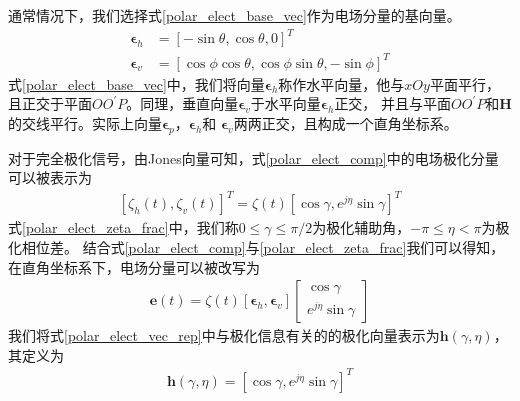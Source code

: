 \documentclass[master]{thesis-uestc}
\begin{document}
通常情况下，我们选择式\eqref{polar_elect_base_vec}作为电场分量的基向量。
\begin{subequations}\label{polar_elect_base_vec}
    \begin{align}
        \bm{\epsilon}_{h} &=[-\sin \theta, \cos \theta, 0]^{T} \\
        \bm{\epsilon}_{v} &=[\cos \phi \cos \theta, \cos \phi \sin \theta,-\sin \phi]^{T}
    \end{align}
\end{subequations}
式\eqref{polar_elect_base_vec}中，我们将向量$\bm{\epsilon}_h$称作水平向量，他与$xOy$平面平行，
且正交于平面$OO^\prime P$。同理，垂直向量$\bm{\epsilon}_v$于水平向量$\bm{\epsilon}_h$正交，
并且与平面$OO^\prime P$和$\bm{H}$的交线平行。实际上向量$\bm{\epsilon}_p$，$\bm{\epsilon}_h$和
$\bm{\epsilon}_v$两两正交，且构成一个直角坐标系。

对于完全极化信号，由Jones向量可知，式\eqref{polar_elect_comp}中的电场极化分量可以被表示为
\begin{equation}\label{polar_elect_zeta_frac}
    \begin{aligned}
        \left[\zeta_{h}(t), \zeta_{v}(t)\right]^{T}=\zeta(t)\left[\cos \gamma, e^{j \eta} \sin \gamma\right]^{T}
    \end{aligned}
\end{equation}
式\eqref{polar_elect_zeta_frac}中，我们称$0\le\gamma\le\pi/2$为极化辅助角，$-\pi\le\eta<\pi$为极化相位差。
结合式\eqref{polar_elect_comp}与\eqref{polar_elect_zeta_frac}我们可以得知，在直角坐标系下，电场分量可以被改写为
\begin{equation}\label{polar_elect_vec_rep}
    \begin{aligned}
        \boldsymbol{e}(t)=\zeta(t)\left[\boldsymbol{\epsilon}_{h}, \boldsymbol{\epsilon}_{v}\right]
        \left[\begin{array}{c}
            \cos \gamma \\
            e^{j \eta} \sin \gamma
            \end{array}
        \right]
    \end{aligned}
\end{equation}
我们将式\eqref{polar_elect_vec_rep}中与极化信息有关的的极化向量表示为$\bm{h}(\gamma,\eta)$，其定义为
\begin{equation}\label{polar_vec}
    \begin{aligned}
        \bm{h}(\gamma, \eta)=\left[\cos \gamma, e^{j \eta} \sin \gamma\right]^{T}
    \end{aligned}
\end{equation}
\end{document}
